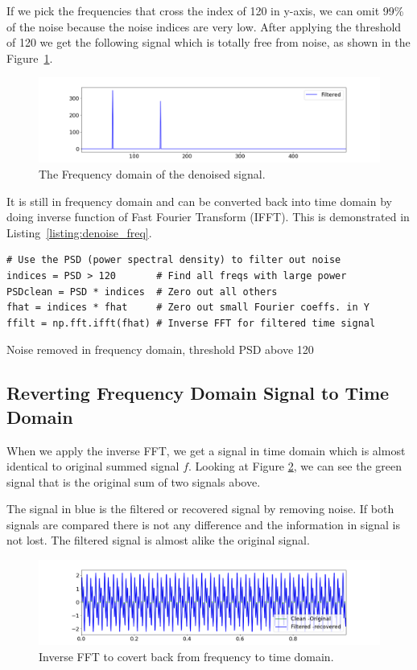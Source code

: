 \documentclass[a4paper, 12pt]{scrartcl}
\begin{document}
If we pick the frequencies that cross the index of 120 in y-axis, we can omit 99\% of the noise because the noise indices are very low.
After applying the threshold of 120 we get the following signal which is totally free from noise, as shown in the Figure~\ref{fig:denoise_freq}.
\begin{figure}[H] 
  \centering
  \includegraphics[width=\textwidth]{img/denoise_freq.png}
  \caption{The Frequency domain of the denoised signal.}
  \label{fig:denoise_freq}
\end{figure}
It is still in frequency domain and can be converted back into time domain by doing inverse function of Fast Fourier Transform (IFFT).
This is demonstrated in Listing~\ref{listing:denoise_freq}.
\begin{listing}[H]
\begin{verbatim}
# Use the PSD (power spectral density) to filter out noise
indices = PSD > 120       # Find all freqs with large power
PSDclean = PSD * indices  # Zero out all others
fhat = indices * fhat     # Zero out small Fourier coeffs. in Y
ffilt = np.fft.ifft(fhat) # Inverse FFT for filtered time signal
\end{verbatim}
\caption{Noise removed in frequency domain, threshold PSD above 120}
\label{listing:denoise_freq}
\end{listing}

\subsection{Reverting Frequency Domain Signal to Time Domain}
When we apply the inverse FFT, we get a signal in time domain which is almost identical to original summed signal $f$.
Looking at Figure \ref{fig:fft_infft_signals}, we can see the green signal that is the original sum of two signals above.

The signal in blue is the filtered or recovered signal by removing noise.
If both signals are compared there is not any difference and the information in signal is not lost. 
The filtered signal is almost alike the original signal.
\begin{figure}[H] 
  \centering
  \includegraphics[width=\textwidth]{img/fft_infft_signals.png}
  \caption{Inverse FFT to covert back from frequency to time domain.}
  \label{fig:fft_infft_signals}
\end{figure}
\end{document}
